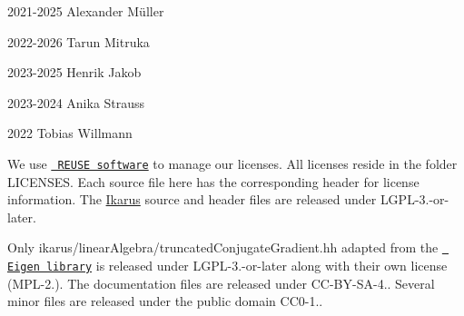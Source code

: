 
\begin{DoxyItemize}
\item 2021-\/2025 Alexander Müller
\item 2022-\/2026 Tarun Mitruka
\item 2023-\/2025 Henrik Jakob
\item 2023-\/2024 Anika Strauss
\item 2022 Tobias Willmann
\end{DoxyItemize}

We use \href{https://reuse.software/}{\texttt{ REUSE software}} to manage our licenses. All licenses reside in the folder {\ttfamily LICENSES}. Each source file here has the corresponding header for license information. The \mbox{\hyperlink{a00510}{Ikarus}} source and header files are released under {\ttfamily LGPL-\/3.-\/or-\/later}.

Only {\ttfamily ikarus/linear\+Algebra/truncated\+Conjugate\+Gradient.\+hh} adapted from the \href{https://eigen.tuxfamily.org/index.php?title=Main_Page}{\texttt{ Eigen library}} is released under {\ttfamily LGPL-\/3.-\/or-\/later} along with their own license ({\ttfamily MPL-\/2.}). The documentation files are released under {\ttfamily CC-\/\+BY-\/\+SA-\/4.}. Several minor files are released under the public domain {\ttfamily CC0-\/1.}. 